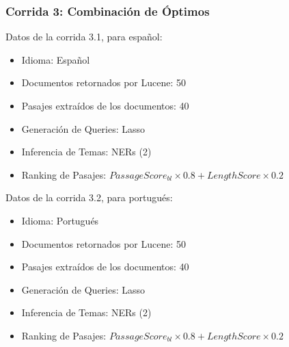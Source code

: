 \begin{frame}
\frametitle{Corrida 3: Combinación de Óptimos}

\medskip

Datos de la corrida 3.1, para español:
\begin{itemize}
  \item Idioma: Español
  \item Documentos retornados por Lucene: 50
  \item Pasajes extraídos de los documentos: 40
  \item Generación de Queries: Lasso
  \item Inferencia de Temas: NERs (2)
  \item Ranking de Pasajes: $PassageScore_{bl} \times 0.8 + LengthScore \times 0.2$
\end{itemize}

\medskip
Datos de la corrida 3.2, para portugués:
\begin{itemize}
  \item Idioma: {\color{blue}Portugués}
  \item Documentos retornados por Lucene: 50
  \item Pasajes extraídos de los documentos: 40
  \item Generación de Queries: Lasso
  \item Inferencia de Temas: NERs (2)
  \item Ranking de Pasajes: $PassageScore_{bl} \times 0.8 + LengthScore \times 0.2$
\end{itemize}

\end{frame}

